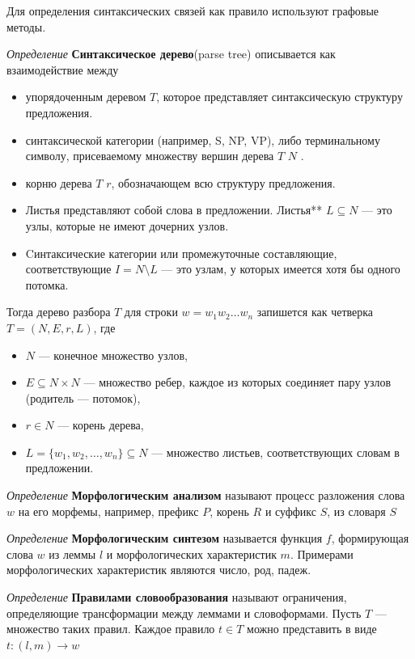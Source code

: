 Для определения синтаксических связей как правило используют графовые методы.

\textit{Определение} \textbf{Синтаксическое дерево}(parse tree) описывается как взаимодействие между \begin{itemize}
    \item упорядоченным деревом $T$, которое представляет синтаксическую структуру предложения.
    \item синтаксической категории (например, S, NP, VP), либо терминальному символу, присеваемому множеству вершин дерева $T$ $N$ . 
    \item корню дерева $T$  $r$, обозначающем всю структуру предложения. 
    \item Листья представляют собой слова в предложении. Листья** $L \subseteq N$ — это узлы, которые не имеют дочерних узлов. 
    \item Cинтаксические категории или промежуточные составляющие, соответствующие $I = N \setminus L$ — это узлам, у которых имеется хотя бы одного потомка. 
\end{itemize}

Тогда дерево разбора $T$ для строки $w = w_1 w_2 \ldots w_n$ запишется как четверка $T = (N, E, r, L)$, где \begin{itemize}
    \item $N$ — конечное множество узлов,
    \item $E \subseteq N \times N$ — множество ребер, каждое из которых соединяет пару узлов (родитель — потомок),
    \item  $r \in N$ — корень дерева,
    \item $L = \{ w_1, w_2, \ldots, w_n \} \subseteq N$ — множество листьев, соответствующих словам в предложении.
\end{itemize}


\textit{Определение} \textbf{Морфологическим анализом} называют процесс разложения 
слова $w$ на его морфемы, например, префикс $P$, корень $R$ и суффикс $S$, из словаря $S$

\textit{Определение} \textbf{Морфологическим синтезом} называется функция $f$,
формирующая слова $w$ из леммы $l$ и морфологических характеристик $m$. 
Примерами морфологических характеристик являются число, род, падеж.
 
\textit{Определение} \textbf{Правилами словообразования} называют ограничения,
 определяющие трансформации между леммами и словоформами. 
 Пусть \( T \) — множество таких правил. Каждое правило \( t \in T \) можно представить в виде
 $t: (l, m) \rightarrow w$

